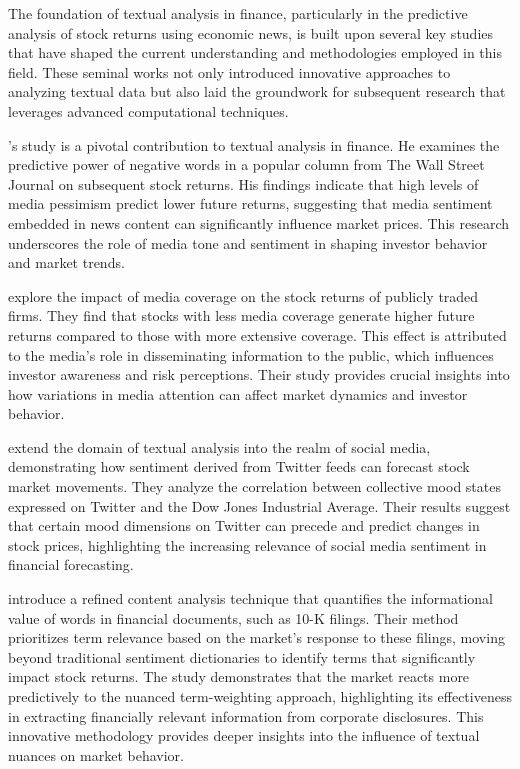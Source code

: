 
The foundation of textual analysis in finance, particularly in the predictive analysis of stock returns using economic news, is built upon several key studies that have shaped the current understanding and methodologies employed in this field. These seminal works not only introduced innovative approaches to analyzing textual data but also laid the groundwork for subsequent research that leverages advanced computational techniques.

\mx
\cite{tetlock2007giving}
's study is a pivotal contribution to textual analysis in finance. He examines the predictive power of negative words in a popular column from The Wall Street Journal on subsequent stock returns. His findings indicate that high levels of media pessimism predict lower future returns, suggesting that media sentiment embedded in news content can significantly influence market prices. This research underscores the role of media tone and sentiment in shaping investor behavior and market trends.

\mx
\cite{fang2009media}
explore the impact of media coverage on the stock returns of publicly traded firms. They find that stocks with less media coverage generate higher future returns compared to those with more extensive coverage. This effect is attributed to the media's role in disseminating information to the public, which influences investor awareness and risk perceptions. Their study provides crucial insights into how variations in media attention can affect market dynamics and investor behavior.

\mx
\cite{bollen2011twitter} 
extend the domain of textual analysis into the realm of social media, demonstrating how sentiment derived from Twitter feeds can forecast stock market movements. They analyze the correlation between collective mood states expressed on Twitter and the Dow Jones Industrial Average. Their results suggest that certain mood dimensions on Twitter can precede and predict changes in stock prices, highlighting the increasing relevance of social media sentiment in financial forecasting.

\mx
\cite{jegadeesh2013word} 
introduce a refined content analysis technique that quantifies the informational value of words in financial documents, such as 10-K filings. Their method prioritizes term relevance based on the market's response to these filings, moving beyond traditional sentiment dictionaries to identify terms that significantly impact stock returns. The study demonstrates that the market reacts more predictively to the nuanced term-weighting approach, highlighting its effectiveness in extracting financially relevant information from corporate disclosures. This innovative methodology provides deeper insights into the influence of textual nuances on market behavior.

